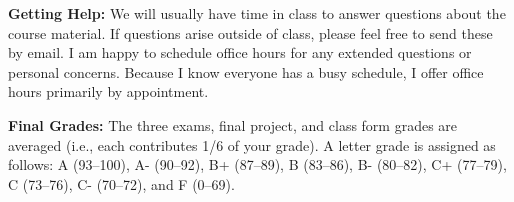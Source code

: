 \documentclass[11pt, a4paper]{article}
\begin{document}
\bigskip

\textbf{Getting Help:}
We will usually have time in class to answer questions about the course
material. If questions arise outside of class, please feel free to send
these by email. I am happy to schedule office hours for any extended questions
or personal concerns. Because I know everyone has a busy schedule, I offer
office hours primarily by appointment.

\bigskip

\textbf{Final Grades:}
The three exams, final project, and class form grades are averaged (i.e., each
contributes 1/6 of your grade). A letter grade is assigned as follows:
             A (93--100), A- (90--92),
B+ (87--89), B (83--86),  B- (80--82),
C+ (77--79), C (73--76),  C- (70--72), and F (0--69).
\end{document}
